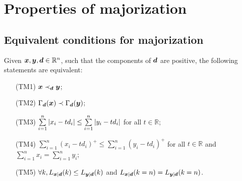 \section{Properties of majorization}
\label{app:major}

\subsection{Equivalent conditions for majorization}

\begin{theorem}
Given $\bm{x}, \bm{y}, \bm{d} \in \mathbb{R}^n$, such that the components of $\bm{d}$ are positive, the following statements are equivalent:
 \begin{enumerate}
	\item[(TM1)] $\bm{x} \prec_{\bm{d}} \bm{y}$;
	\item[(TM2)] $\Gamma_{\bm{d}}({\bm{x}}) \prec \Gamma_{\bm{d}}({\bm{y}})$;
	\item[(TM3)]\label{en:tm3} $\sum\limits_{i=1}^n \abs{x_i - t d_i} \leq \sum\limits_{i=1}^n \abs{y_i - t d_i}$ for all $t \in \mathbb{R}$;
	\item[(TM4)] $\sum\limits_{i=1}^n (x_i - t d_i)^+ \leq \sum\limits_{i=1}^n (y_i - t d_i)^+$ for all $t \in \mathbb{R}$ and $\sum\limits_{i=1}^n x_i = \sum\limits_{i=1}^n y_i$;
	\item[(TM5)] $\forall k, L_{\bm{x}|\bm{d}}(k) \leq L_{\bm{y}|\bm{d}}(k)$ and $L_{\bm{x}|\bm{d}}(k=n) = L_{\bm{y}|\bm{d}}(k=n)$.
 \end{enumerate}
\end{theorem}
